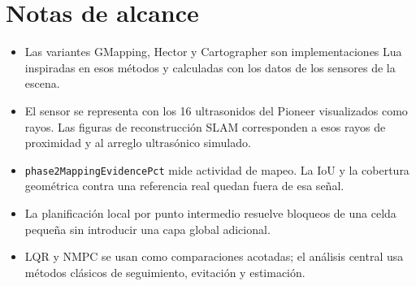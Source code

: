 \section{Notas de alcance}

\begin{itemize}
  \item Las variantes GMapping, Hector y Cartographer son implementaciones Lua
  inspiradas en esos métodos y calculadas con los datos de los sensores de la escena.
  \item El sensor se representa con los 16 ultrasonidos del Pioneer visualizados
  como rayos. Las figuras de reconstrucción SLAM corresponden a esos rayos de
  proximidad y al arreglo ultrasónico simulado.
  \item \texttt{phase2MappingEvidencePct} mide actividad de mapeo. La IoU y la
  cobertura geométrica contra una referencia real quedan fuera de esa señal.
  \item La planificación local por punto intermedio resuelve bloqueos de una celda
  pequeña sin introducir una capa global adicional.
  \item LQR y NMPC se usan como comparaciones acotadas; el análisis central usa
  métodos clásicos de seguimiento, evitación y estimación.
\end{itemize}
